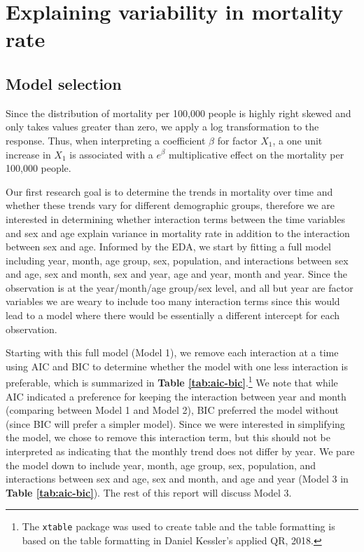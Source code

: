 \documentclass[letterpaper, 11pt]{article}
\begin{document}
\section{Explaining variability in mortality rate}

\subsection{Model selection}\label{mod.sel}

Since the distribution of mortality per 100,000 people is highly right skewed and only takes values greater than zero, we apply a log transformation to the response. Thus, when interpreting a coefficient $\beta$ for factor $X_1$, a one unit increase in $X_1$ is associated with a $e^{\beta}$ multiplicative effect on the mortality per 100,000 people.

Our first research goal is to determine the trends in mortality over time and whether these trends vary for different demographic groups, therefore we are interested in determining whether interaction terms between the time variables and sex and age explain variance in mortality rate in addition to the interaction between sex and age. Informed by the EDA, we start by fitting a full model including year, month, age group, sex, population, and interactions between sex and age, sex and month, sex and year, age and year, month and year. Since the observation is at the year/month/age group/sex level, and all but year are factor variables we are weary to include too many interaction terms since this would lead to a model where there would be essentially a different intercept for each observation.

Starting with this full model (Model 1), we remove each interaction at a time using AIC and BIC to determine whether the model with one less interaction is preferable, which is summarized in \textbf{Table \ref{tab:aic-bic}}.\footnote{The \texttt{xtable} package \cite{xtable} was used to create table and the table formatting is based on the table formatting in Daniel Kessler's applied QR, 2018.} We note that while AIC indicated a preference for keeping the interaction between year and month (comparing between Model 1 and Model 2), BIC preferred the model without (since BIC will prefer a simpler model). Since we were interested in simplifying the model, we chose to remove this interaction term, but this should not be interpreted as indicating that the monthly trend does not differ by year. We pare the model down to include year, month, age group, sex, population, and interactions between sex and age, sex and month, and age and year (Model 3 in \textbf{Table \ref{tab:aic-bic}}). The rest of this report will discuss Model 3.
\end{document}
